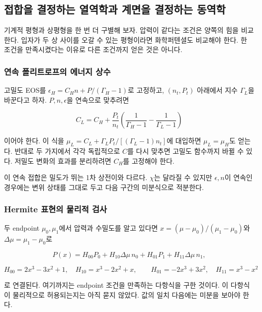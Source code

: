 \documentclass[
  10pt,
  a4paper,
]{article}
\begin{document}
\subsection{접합을 결정하는 열역학과 계면을 결정하는
동역학}\label{uxc811uxd569uxc744-uxacb0uxc815uxd558uxb294-uxc5f4uxc5eduxd559uxacfc-uxacc4uxba74uxc744-uxacb0uxc815uxd558uxb294-uxb3d9uxc5eduxd559}

기계적 평형과 상평형을 한 번 더 구별해 보자. 압력이 같다는 조건은 양쪽의
힘을 비교한다. 입자가 두 상 사이를 오갈 수 있는 평형이라면 화학퍼텐셜도
비교해야 한다. 한 조건을 만족시켰다는 이유로 다른 조건까지 얻은 것은
아니다.

\subsubsection{연속 폴리트로프의 에너지
상수}\label{uxc5f0uxc18d-uxd3f4uxb9acuxd2b8uxb85cuxd504uxc758-uxc5d0uxb108uxc9c0-uxc0c1uxc218}

고밀도 EOS를 \(\epsilon_H=C_Hn+P/(\Gamma_H-1)\)로 고정하고,
\((n_t,P_t)\) 아래에서 지수 \(\Gamma_L\)을 바꾼다고 하자.
\(P,n,\epsilon\)을 연속으로 맞추려면

\[
C_L=C_H+\frac{P_t}{n_t}
\left(\frac{1}{\Gamma_H-1}-\frac{1}{\Gamma_L-1}\right)
\]

이어야 한다. 이 식을 \(\mu_L=C_L+\Gamma_LP_t/[(\Gamma_L-1)n_t]\)에
대입하면 \(\mu_L=\mu_H\)도 얻는다. 반대로 두 가지에서 각각 독립적으로
\(C\)를 다시 맞추면 고밀도 함수까지 바뀔 수 있다. 저밀도 변화의 효과를
분리하려면 \(C_H\)를 고정해야 한다.

이 연속 접합은 밀도가 뛰는 1차 상전이와 다르다. \(\chi\)는 달라질 수
있지만 \(\epsilon,n\)이 연속인 경우에는 변위 상태를 그대로 두고 다음
구간의 미분식으로 적분한다.

\subsubsection{Hermite 표현의 물리적
검사}\label{hermite-uxd45cuxd604uxc758-uxbb3cuxb9acuxc801-uxac80uxc0ac}

두 endpoint \(\mu_0,\mu_1\)에서 압력과 수밀도를 알고 있다면
\(x=(\mu-\mu_0)/(\mu_1-\mu_0)\)와 \(\Delta\mu=\mu_1-\mu_0\)로

\[
P(x)=H_{00}P_0+H_{10}\Delta\mu\,n_0
       +H_{01}P_1+H_{11}\Delta\mu\,n_1,
\]

\[
H_{00}=2x^3-3x^2+1,\quad H_{10}=x^3-2x^2+x,
\qquad H_{01}=-2x^3+3x^2,\quad H_{11}=x^3-x^2
\]

로 연결된다. 여기까지는 endpoint 조건을 만족하는 다항식을 구한 것이다.
이 다항식이 물리적으로 허용되는지는 아직 묻지 않았다. 값의 일치 다음에는
미분을 보아야 한다.
\end{document}

